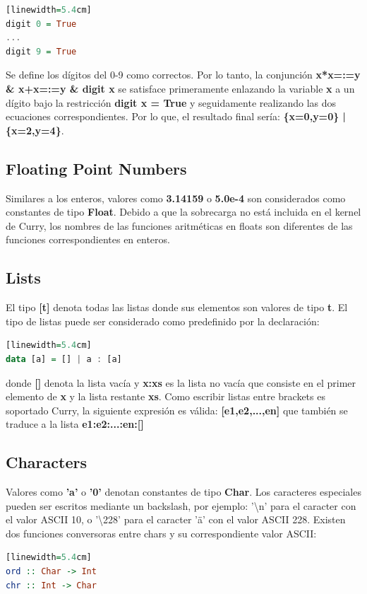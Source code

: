 \documentclass[10pt,journal,compsoc]{IEEEtran}
\begin{document}
\begin{lstlisting}[language=Haskell, caption = {C\'odigo de ejemplo de restricciones con Integers}][linewidth=5.4cm]
digit 0 = True
...
digit 9 = True
\end{lstlisting}
Se define los d\'igitos del 0-9 como correctos. Por lo tanto, la conjunci\'on \textbf{x*x=:=y \& x+x=:=y \& digit x} se satisface primeramente enlazando la variable \textbf{x} a un d\'igito bajo la restricci\'on \textbf{digit x = True} y seguidamente realizando las dos ecuaciones correspondientes. Por lo que, el resultado final ser\'ia: \textbf{\{x=0,y=0\} | \{x=2,y=4\}}.

\subsection{Floating Point Numbers}
Similares a los enteros, valores como \textbf{3.14159} o \textbf{5.0e-4} son considerados como constantes de tipo \textbf{Float}. Debido a que la sobrecarga no est\'a incluida en el kernel de Curry, los nombres de las funciones aritm\'eticas en floats son diferentes de las funciones correspondientes en enteros.

\subsection{Lists}
El tipo \textbf{[t]} denota todas las listas donde sus elementos son valores de tipo \textbf{t}. El tipo de listas puede ser considerado como predefinido por la declaraci\'on:
\begin{lstlisting}[language=Haskell, caption = {C\'odigo de ejemplo de declaraci\'on de listas}][linewidth=5.4cm]
data [a] = [] | a : [a]
\end{lstlisting}
donde \textbf{[]} denota la lista vac\'ia y \textbf{x:xs} es la lista no vac\'ia que consiste en el primer elemento de \textbf{x} y la lista restante \textbf{xs}. Como escribir listas entre brackets es soportado Curry, la siguiente expresi\'on es v\'alida: \textbf{[e1,e2,...,en]} que tambi\'en se traduce a la lista \textbf{e1:e2:...:en:[]}
 
\subsection{Characters}
Valores como \textbf{'a'} o \textbf{'0'} denotan constantes de tipo \textbf{Char}. Los caracteres especiales pueden ser escritos mediante un backslash, por ejemplo: '\textbackslash{n}' para el caracter con el valor ASCII 10, o '\textbackslash{228}' para el caracter '{\"a}' con el valor ASCII 228. Existen dos funciones conversoras entre chars y su correspondiente valor ASCII: \
\begin{lstlisting}[language=Haskell, caption = {C\'odigo de funciones conversoras de Char-ASCII-Char}][linewidth=5.4cm]
ord :: Char -> Int 
chr :: Int -> Char
\end{lstlisting}
\end{document}
